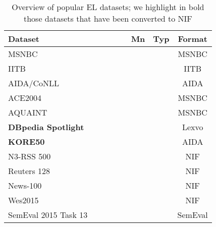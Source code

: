 \documentclass[sigconf]{acmart}
\newcommand{\cmark}{\ding{51}}%
\newcommand{\xmark}{\ding{55}}%
\begin{document}
\newcommand{\ccell}[1]{\multicolumn{1}{c}{#1}}
\newcommand{\rcell}[1]{\multicolumn{1}{r}{#1}}
\begin{table}[tb!]
\centering
\caption{Overview of popular EL datasets; we highlight in bold those datasets that have been converted to NIF \label{tab:datasets}} 
\begin{tabular}{lccc}
\toprule
\textbf{Dataset}~~~~~~~~~~~~~~~~~~ & \ccell{\textbf{Mn}} & \ccell{\textbf{Typ}}&\ccell{\textbf{Format}}\\\midrule
MSNBC~\cite{cucerzan2007large}      &\xmark &\xmark & MSNBC \\ %
IITB~\cite{IITB2009}                &\cmark &\xmark & IITB  \\ %
AIDA/CoNLL~\cite{aida2011}          &\cmark &\xmark & AIDA  \\ %
ACE2004~\cite{aquaint}              &\xmark &\xmark & MSNBC \\ %
AQUAINT~\cite{aquaint}              &\xmark &\xmark & MSNBC \\ %
\textbf{DBpedia Spotlight}
\cite{mendes2011dbpedia}            &\cmark &\xmark & Lexvo \\ %
\textbf{KORE50}~\cite{kore50}       &\cmark &\xmark & AIDA  \\ %
N3-RSS 500~\cite{N3}                &\cmark &\xmark & NIF   \\ %
Reuters 128~\cite{N3}               &\cmark &\xmark & NIF   \\ %
News-100~\cite{N3}                  &\cmark &\xmark & NIF   \\ %
Wes2015~\cite{wes2015}              &\cmark &\xmark & NIF   \\ %
SemEval 2015 
Task 13~\cite{moro2015semeval}      &\cmark &\xmark & SemEval \\ %

\end{tabular}
\end{table}
\end{document}
